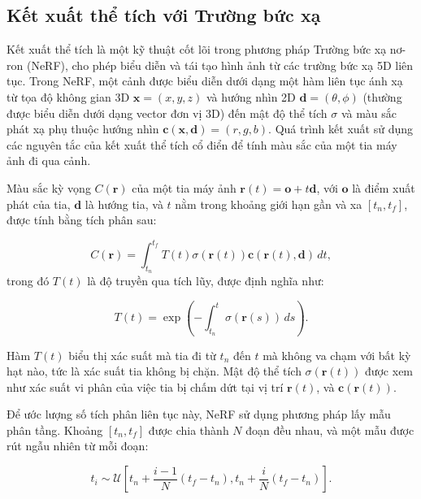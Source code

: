 \subsection{Kết xuất thể tích với Trường bức xạ} \label{subsec:volume_rendering}

Kết xuất thể tích là một kỹ thuật cốt lõi trong phương pháp Trường bức xạ nơ-ron (NeRF), cho phép biểu diễn và tái tạo hình ảnh từ các trường bức xạ 5D liên tục. Trong NeRF, một cảnh được biểu diễn dưới dạng một hàm liên tục ánh xạ từ tọa độ không gian 3D $\mathbf{x} = (x, y, z)$ và hướng nhìn 2D $\mathbf{d} = (\theta, \phi)$ (thường được biểu diễn dưới dạng vector đơn vị 3D) đến mật độ thể tích $\sigma$ và màu sắc phát xạ phụ thuộc hướng nhìn $\mathbf{c}(\mathbf{x}, \mathbf{d}) = (r, g, b)$\cite{Mildenhall2020NeRF}. Quá trình kết xuất sử dụng các nguyên tắc của kết xuất thể tích cổ điển để tính màu sắc của một tia máy ảnh đi qua cảnh.

Màu sắc kỳ vọng $C(\mathbf{r})$ của một tia máy ảnh $\mathbf{r}(t) = \mathbf{o} + t \mathbf{d}$, với $\mathbf{o}$ là điểm xuất phát của tia, $\mathbf{d}$ là hướng tia, và $t$ nằm trong khoảng giới hạn gần và xa $[t_n, t_f]$, được tính bằng tích phân sau:

\begin{equation}
C(\mathbf{r}) = \int_{t_n}^{t_f} T(t) \sigma(\mathbf{r}(t)) \mathbf{c}(\mathbf{r}(t), \mathbf{d}) \, dt,
\end{equation}
trong đó $T(t)$ là độ truyền qua tích lũy, được định nghĩa như:

\begin{equation}\label{do_truyen_qua}
T(t) = \exp\left(-\int_{t_n}^{t} \sigma(\mathbf{r}(s)) \, ds\right).
\end{equation}

Hàm $T(t)$ biểu thị xác suất mà tia đi từ $t_n$ đến $t$ mà không va chạm với bất kỳ hạt nào, tức là xác suất tia không bị chặn. Mật độ thể tích $\sigma(\mathbf{r}(t))$ được xem như xác suất vi phân của việc tia bị chấm dứt tại vị trí $\mathbf{r}(t)$, và $\mathbf{c}(\mathbf{r}(t))$.

Để ước lượng số tích phân liên tục này, NeRF sử dụng phương pháp lấy mẫu phân tầng. Khoảng $[t_n, t_f]$ được chia thành $N$ đoạn đều nhau, và một mẫu được rút ngẫu nhiên từ mỗi đoạn:

\begin{equation}
t_i \sim \mathcal{U}\left[t_n + \frac{i-1}{N}(t_f - t_n), t_n + \frac{i}{N}(t_f - t_n)\right].
\end{equation}


